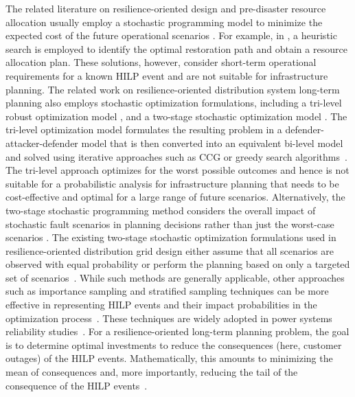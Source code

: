 \documentclass[hidelinks, 12pt]{article}
\begin{document}
The related literature on resilience-oriented design and pre-disaster resource allocation usually employ a stochastic programming model to minimize the expected cost of the future operational scenarios  \cite{gao2017resilience , zhang2021stochastic}. For example, in \cite{gao2017resilience}, a heuristic search is employed to identify the optimal restoration path and obtain a resource allocation plan. These solutions, however, consider short-term operational requirements for a known HILP event and are not suitable for infrastructure planning. The related work on resilience-oriented distribution system long-term planning also employs stochastic optimization formulations, including a tri-level robust optimization model \cite{yuan2016robust, wang2018resilience}, and a two-stage stochastic optimization model \cite{ma2018resilience, ma2019resilience, liu2019unified}. The tri-level optimization model formulates the resulting problem in a defender-attacker-defender model that is then converted into an equivalent bi-level model and solved using iterative approaches such as CCG or greedy search algorithms~\cite{yuan2016robust}. The tri-level approach optimizes for the worst possible outcomes and hence is not suitable for a probabilistic analysis for infrastructure planning that needs to be cost-effective and optimal for a large range of future scenarios. Alternatively, the two-stage stochastic programming method considers the overall impact of stochastic fault scenarios in planning decisions rather than just the worst-case scenarios \cite{ma2018resilience, shi2020resilience}. The existing two-stage stochastic optimization formulations used in resilience-oriented distribution grid design either assume that all scenarios are observed with equal probability or perform the planning based on only a targeted set of scenarios~\cite{2021IASTATE, 8329529, 9136725}. While such methods are generally applicable, other approaches such as importance sampling and stratified sampling techniques can be more effective in representing HILP events and their impact probabilities in the optimization process~\cite{glynn1989importance, rush2000stratified}. These techniques are widely adopted in power systems reliability studies~\cite{8887536, 7084698}. For a resilience-oriented long-term planning problem, the goal is to determine optimal investments to reduce the consequences (here, customer outages) of the HILP events. Mathematically, this amounts to minimizing the mean of consequences and, more importantly, reducing the tail of the consequence of the HILP events~\cite{9120304}.
\end{document}
